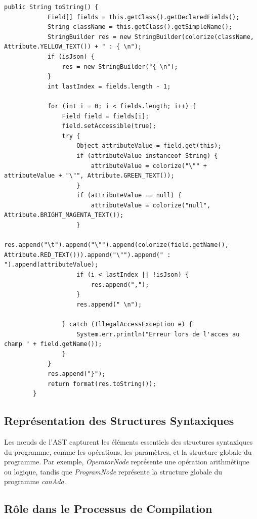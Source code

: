 \documentclass[french,a4paper]{article}
\begin{document}
    \begin{lstlisting}[label={lst:lstlisting14}]
        public String toString() {
            Field[] fields = this.getClass().getDeclaredFields();
            String className = this.getClass().getSimpleName();
            StringBuilder res = new StringBuilder(colorize(className, Attribute.YELLOW_TEXT()) + " : { \n");
            if (isJson) {
                res = new StringBuilder("{ \n");
            }
            int lastIndex = fields.length - 1;

            for (int i = 0; i < fields.length; i++) {
                Field field = fields[i];
                field.setAccessible(true);
                try {
                    Object attributeValue = field.get(this);
                    if (attributeValue instanceof String) {
                        attributeValue = colorize("\"" + attributeValue + "\"", Attribute.GREEN_TEXT());
                    }
                    if (attributeValue == null) {
                        attributeValue = colorize("null", Attribute.BRIGHT_MAGENTA_TEXT());
                    }
                    res.append("\t").append("\"").append(colorize(field.getName(), Attribute.RED_TEXT())).append("\"").append(" : ").append(attributeValue);
                    if (i < lastIndex || !isJson) {
                        res.append(",");
                    }
                    res.append(" \n");

                } catch (IllegalAccessException e) {
                    System.err.println("Erreur lors de l'acces au champ " + field.getName());
                }
            }
            res.append("}");
            return format(res.toString());
        }
    \end{lstlisting}

    \subsection{Représentation des Structures Syntaxiques}\label{subsec:representation-des-structures-syntaxiques}

    Les nœuds de l'AST capturent les éléments essentiels des structures syntaxiques du programme, comme les opérations, les paramètres, et la structure globale du programme.
    Par exemple, \textit{OperatorNode} représente une opération arithmétique ou logique, tandis que \textit{ProgramNode} représente la structure globale du programme \textit{canAda}.

    \subsection{Rôle dans le Processus de Compilation}\label{subsec:role-dans-le-processus-de-compilation}
\end{document}
